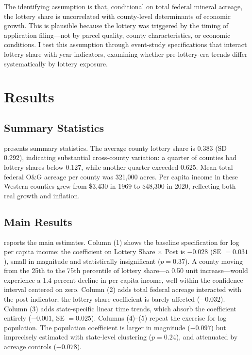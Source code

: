 \documentclass[12pt]{article}
\begin{document}
The identifying assumption is that, conditional on total federal mineral acreage, the lottery share is uncorrelated with county-level determinants of economic growth. This is plausible because the lottery was triggered by the timing of application filing---not by parcel quality, county characteristics, or economic conditions. I test this assumption through event-study specifications that interact lottery share with year indicators, examining whether pre-lottery-era trends differ systematically by lottery exposure.


\section{Results}

\subsection{Summary Statistics}

 presents summary statistics. The average county lottery share is 0.383 (SD 0.292), indicating substantial cross-county variation: a quarter of counties had lottery shares below 0.127, while another quarter exceeded 0.625. Mean total federal O\&G acreage per county was 321,000 acres. Per capita income in these Western counties grew from \$3,430 in 1969 to \$48,300 in 2020, reflecting both real growth and inflation.



\subsection{Main Results}

 reports the main estimates. Column (1) shows the baseline specification for log per capita income: the coefficient on Lottery Share $\times$ Post is $-0.028$ (SE $= 0.031$), small in magnitude and statistically insignificant ($p = 0.37$). A county moving from the 25th to the 75th percentile of lottery share---a 0.50 unit increase---would experience a 1.4 percent decline in per capita income, well within the confidence interval centered on zero. Column (2) adds total federal acreage interacted with the post indicator; the lottery share coefficient is barely affected ($-0.032$). Column (3) adds state-specific linear time trends, which absorb the coefficient entirely ($-0.001$, SE $= 0.025$). Columns (4)--(5) repeat the exercise for log population. The population coefficient is larger in magnitude ($-0.097$) but imprecisely estimated with state-level clustering ($p = 0.24$), and attenuated by acreage controls ($-0.078$).
\end{document}
